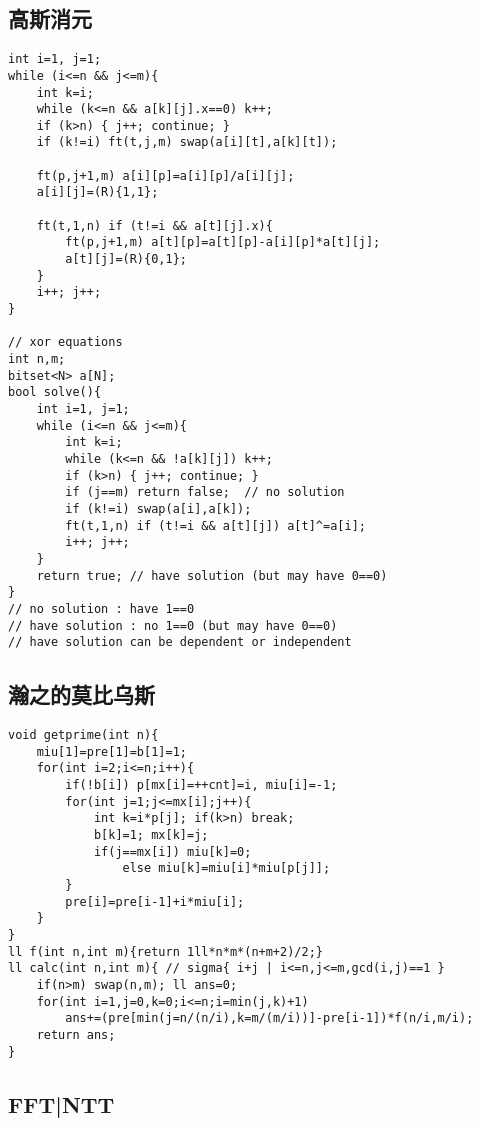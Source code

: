\documentclass{article}
\begin{document}
\subsection{高斯消元}
\begin{lstlisting}
int i=1, j=1;
while (i<=n && j<=m){
	int k=i;
	while (k<=n && a[k][j].x==0) k++;
	if (k>n) { j++; continue; }
	if (k!=i) ft(t,j,m) swap(a[i][t],a[k][t]);
	
	ft(p,j+1,m) a[i][p]=a[i][p]/a[i][j];
	a[i][j]=(R){1,1};
	
	ft(t,1,n) if (t!=i && a[t][j].x){
		ft(p,j+1,m) a[t][p]=a[t][p]-a[i][p]*a[t][j];
		a[t][j]=(R){0,1};
	}
	i++; j++;
}

// xor equations
int n,m;
bitset<N> a[N];
bool solve(){
	int i=1, j=1;	
	while (i<=n && j<=m){
		int k=i;
		while (k<=n && !a[k][j]) k++;
		if (k>n) { j++; continue; }
		if (j==m) return false;  // no solution
		if (k!=i) swap(a[i],a[k]);
		ft(t,1,n) if (t!=i && a[t][j]) a[t]^=a[i];
		i++; j++;
	}
	return true; // have solution (but may have 0==0)
}
// no solution : have 1==0
// have solution : no 1==0 (but may have 0==0)
// have solution can be dependent or independent
\end{lstlisting}

\subsection{瀚之的莫比乌斯}
\begin{lstlisting}
void getprime(int n){
	miu[1]=pre[1]=b[1]=1;
	for(int i=2;i<=n;i++){
		if(!b[i]) p[mx[i]=++cnt]=i, miu[i]=-1;
		for(int j=1;j<=mx[i];j++){
			int k=i*p[j]; if(k>n) break;
			b[k]=1; mx[k]=j;
			if(j==mx[i]) miu[k]=0;
				else miu[k]=miu[i]*miu[p[j]];
		}
		pre[i]=pre[i-1]+i*miu[i];
	}
}
ll f(int n,int m){return 1ll*n*m*(n+m+2)/2;} 
ll calc(int n,int m){ // sigma{ i+j | i<=n,j<=m,gcd(i,j)==1 }
	if(n>m) swap(n,m); ll ans=0;
	for(int i=1,j=0,k=0;i<=n;i=min(j,k)+1)
		ans+=(pre[min(j=n/(n/i),k=m/(m/i))]-pre[i-1])*f(n/i,m/i);
	return ans;
}
\end{lstlisting}

\subsection{FFT|NTT}
\end{document}
